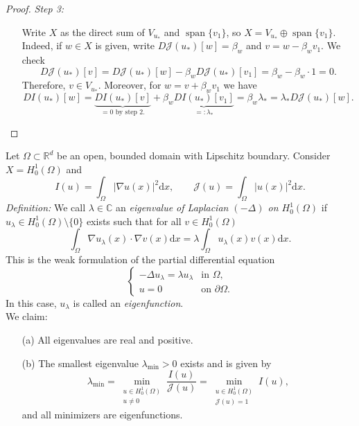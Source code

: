 \begin{proof}
\textit{Step 3:}
\begin{itemize}
	\item[] Write $X$ as the direct sum of $V_{u_*}$ and $\operatorname{span}\{v_1\}$, so $X=V_{u_*}\oplus\operatorname{span}\{v_1\}$. Indeed, if $w\in X$ is given, write $D\mathcal{J}(u_*)[w]=\beta_w$ and $v=w-\beta_wv_1$. We check
	\[D\mathcal{J}(u_*)[v]=D\mathcal{J}(u_*)[w]-\beta_wD\mathcal{J}(u_*)[v_1]=\beta_w-\beta_w\cdot 1=0.\]
	Therefore, $v\in V_{u_*}$. Moreover, for $w=v+\beta_wv_1$ we have
	\[DI(u_*)[w]=\underbrace{DI(u_*)[v]}_{=0\text{ by step 2.}}+\beta_w\underbrace{DI(u_*)[v_1]}_{=:\lambda_*}=\beta_w\lambda_*=\lambda_*D\mathcal{J}(u_*)[w].\]
\end{itemize}
\end{proof}

\begin{example}
Let $\Omega\subset\mathbb{R}^d$ be an open, bounded domain with Lipschitz boundary. Consider $X=H_0^1(\Omega)$ and
\[I(u)=\int_\Omega{\lvert\nabla u(x)\rvert^2\mathrm{d}x},\qquad\mathcal{J}(u)=\int_\Omega{\lvert u(x)\rvert^2\mathrm{d}x}.\]
\textit{Definition:} We call $\lambda\in\mathbb{C}$ an \textit{eigenvalue of Laplacian $(-\Delta)$ on $H_0^1(\Omega)$} if $u_\lambda\in H_0^1(\Omega)\setminus\{0\}$ exists such that for all $v\in H_0^1(\Omega)$
\[\int_\Omega{\nabla u_\lambda(x)\cdot\nabla v(x)\mathrm{d}x}=\lambda\int_\Omega{u_\lambda(x)v(x)\mathrm{d}x}.\]
This is the weak formulation of the partial differential equation
\[\left\{\begin{array}{rl}
	-\Delta u_\lambda=\lambda u_\lambda&\text{in }\Omega,\\
	u=0&\text{on }\partial\Omega.
\end{array}\right.\]
In this case, $u_\lambda$ is called an \textit{eigenfunction}.\\

We claim:
\begin{itemize}
	\item[(a)] All eigenvalues are real and positive.
	\item[(b)] The smallest eigenvalue $\lambda_{\text{min}}>0$ exists and is given by
	\[\lambda_\text{min}=\min_{\substack{u\in H_0^1(\Omega)\\u\ne0}}{\frac{I(u)}{\mathcal{J}(u)}}=\min_{\substack{u\in H_0^1(\Omega)\\\mathcal{J}(u)=1}}{I(u)},\]
	and all minimizers are eigenfunctions.\\
\end{itemize}


\end{example}
